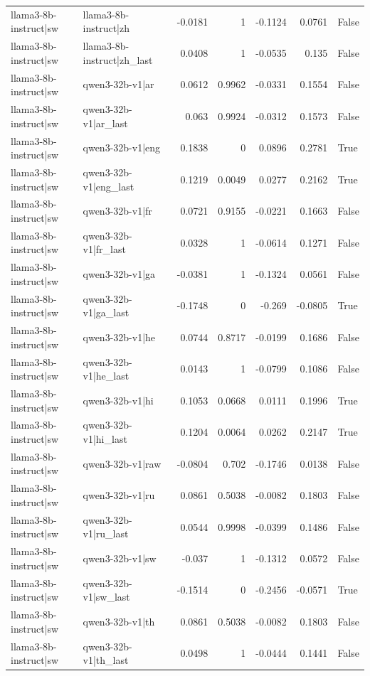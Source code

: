 \begin{table}
\begin{tabular}{l l r r r r l}
llama3-8b-instruct|sw & llama3-8b-instruct|zh & -0.0181 & 1 & -0.1124 & 0.0761 & False \\
llama3-8b-instruct|sw & llama3-8b-instruct|zh_last & 0.0408 & 1 & -0.0535 & 0.135 & False \\
llama3-8b-instruct|sw & qwen3-32b-v1|ar & 0.0612 & 0.9962 & -0.0331 & 0.1554 & False \\
llama3-8b-instruct|sw & qwen3-32b-v1|ar_last & 0.063 & 0.9924 & -0.0312 & 0.1573 & False \\
llama3-8b-instruct|sw & qwen3-32b-v1|eng & 0.1838 & 0 & 0.0896 & 0.2781 & True \\
llama3-8b-instruct|sw & qwen3-32b-v1|eng_last & 0.1219 & 0.0049 & 0.0277 & 0.2162 & True \\
llama3-8b-instruct|sw & qwen3-32b-v1|fr & 0.0721 & 0.9155 & -0.0221 & 0.1663 & False \\
llama3-8b-instruct|sw & qwen3-32b-v1|fr_last & 0.0328 & 1 & -0.0614 & 0.1271 & False \\
llama3-8b-instruct|sw & qwen3-32b-v1|ga & -0.0381 & 1 & -0.1324 & 0.0561 & False \\
llama3-8b-instruct|sw & qwen3-32b-v1|ga_last & -0.1748 & 0 & -0.269 & -0.0805 & True \\
llama3-8b-instruct|sw & qwen3-32b-v1|he & 0.0744 & 0.8717 & -0.0199 & 0.1686 & False \\
llama3-8b-instruct|sw & qwen3-32b-v1|he_last & 0.0143 & 1 & -0.0799 & 0.1086 & False \\
llama3-8b-instruct|sw & qwen3-32b-v1|hi & 0.1053 & 0.0668 & 0.0111 & 0.1996 & True \\
llama3-8b-instruct|sw & qwen3-32b-v1|hi_last & 0.1204 & 0.0064 & 0.0262 & 0.2147 & True \\
llama3-8b-instruct|sw & qwen3-32b-v1|raw & -0.0804 & 0.702 & -0.1746 & 0.0138 & False \\
llama3-8b-instruct|sw & qwen3-32b-v1|ru & 0.0861 & 0.5038 & -0.0082 & 0.1803 & False \\
llama3-8b-instruct|sw & qwen3-32b-v1|ru_last & 0.0544 & 0.9998 & -0.0399 & 0.1486 & False \\
llama3-8b-instruct|sw & qwen3-32b-v1|sw & -0.037 & 1 & -0.1312 & 0.0572 & False \\
llama3-8b-instruct|sw & qwen3-32b-v1|sw_last & -0.1514 & 0 & -0.2456 & -0.0571 & True \\
llama3-8b-instruct|sw & qwen3-32b-v1|th & 0.0861 & 0.5038 & -0.0082 & 0.1803 & False \\
llama3-8b-instruct|sw & qwen3-32b-v1|th_last & 0.0498 & 1 & -0.0444 & 0.1441 & False \\

\end{tabular}
\end{table}
